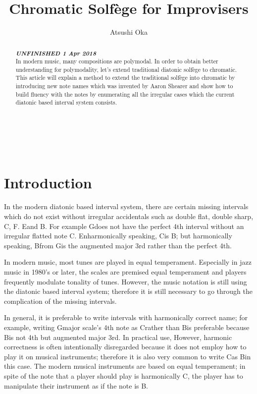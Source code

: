 \documentclass[a4paper]{article}
\title{Chromatic Solfège for Improvisers}
\author{Atsushi Oka}
\date{}
\begin{document}
\maketitle

\begin{abstract}
	\textbf{\textit{ UNFINISHED 1 Apr 2018 }} \\
	
In modern music, many compositions are polymodal. In order to obtain better understanding for polymodality, let’s extend traditional diatonic solfège to chromatic. This article will explain a method to extend the traditional solfège into chromatic by introducing new note names which was invented by Aaron Shearer and show how to build fluency with the notes by enumerating all the irregular cases which the current diatonic based interval system consists.
\end{abstract}

~\\

~\\

\section{Introduction}

In the modern diatonic based interval system, there are certain missing intervals which do not exist without irregular accidentals such as double flat, double sharp, C\flat , F\flat. E\sharp and B\sharp. For example G\flat does not have the perfect 4th interval without an irregular flatted note C\flat.  Enharmonically speaking, C\flat is B\natural; but harmonically speaking, B\natural from G\flat is the augmented major 3rd rather than the perfect 4th. 

In modern music, most tunes are played in equal temperament. Especially in jazz music in 1980’s or later, the scales are premised equal temperament and players frequently modulate tonality of tunes. However, the music notation is still using the diatonic based interval system; therefore it is still necessary to go through the complication of the missing intervals.

In general, it is preferable to write intervals with harmonically correct name; for example, writing G\flat major scale’s 4th note as C\flat rather than B\natural is preferable because B\natural is not 4th but augmented major 3rd. In practical use,  However, harmonic correctness is often intentionally disregarded because it does not employ how to play it on musical instruments; therefore it is also very common to write C\flat as B\natural in this case. The modern musical instruments are based on equal temperament; in spite of the note that a player should play is harmonically C\flat, the player has to manipulate their instrument as if the note is B\natural.
\end{document}
